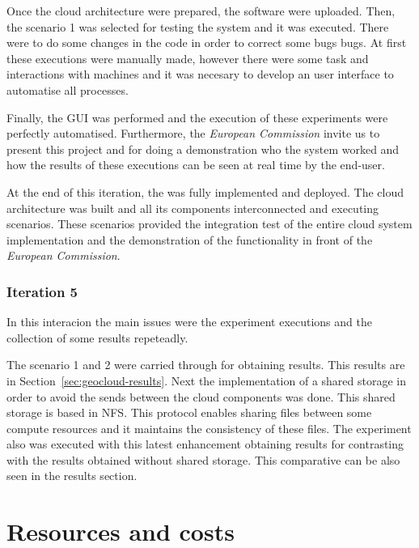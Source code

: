 Once the cloud architecture were prepared, the software were uploaded. Then, the
scenario 1 was selected for testing the system and it was executed. There were
to do some changes in the code in order to correct some bugs bugs. At first
these executions were manually made, however there were some task and
interactions with  machines and it was necesary to develop an user interface to
automatise all processes.

Finally, the \ac{GUI} was performed and the execution of these experiments were
perfectly automatised. Furthermore, the \emph{European Commission} invite us to
present this project and for doing a demonstration who the system worked and how
the results of these executions can be seen at real time by the end-user.

At the end of this iteration, the \sss was fully implemented and deployed. The
cloud architecture was built and all its components interconnected and executing
scenarios. These scenarios provided the integration test of the entire cloud
system implementation and the demonstration of the functionality in front of the
\emph{European Commission}.


\subsubsection{Iteration 5}

In this interacion the main issues were the experiment executions and the
collection of some results repeteadly. 

The scenario 1 and 2 were carried through for obtaining results. This results
are in Section~\ref{sec:geocloud-results}. Next the implementation of a shared
storage in order to avoid the sends between the cloud components was done. This
shared storage is based in \ac{NFS}. This protocol enables sharing files between
some compute resources and it maintains the consistency of these files.
The experiment also was executed with this latest enhancement obtaining results
for contrasting with the results obtained without shared storage. This
comparative can be also seen in the results section.



\section{Resources and costs}

